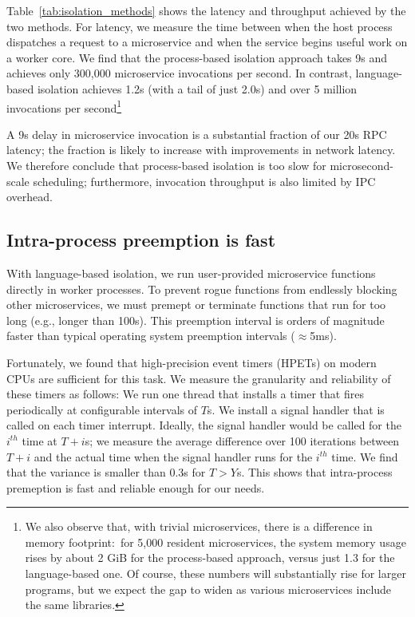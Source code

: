 Table~\ref{tab:isolation_methods} shows the latency and throughput achieved
by the two methods. For latency, we measure the time between when the host
process dispatches a request to a microservice and when the service begins
useful work on a worker core. We find that the process-based isolation approach
takes 9\textmu{}s and achieves only 300,000 microservice invocations per
second. In contrast, language-based isolation achieves 1.2\textmu{}s (with a tail
of just 2.0\textmu{}s) and over 5 million invocations per second\footnote{We also
observe that, with trivial microservices, there is a difference in memory
footprint:\ for 5,000 resident microservices, the system memory usage rises by about
2 GiB for the process-based approach, versus just 1.3 for the language-based one.  Of
course, these numbers will substantially rise for larger programs, but we expect the
gap to widen as various microservices include the same libraries.}

A 9\textmu{}s delay in microservice invocation is a substantial fraction of our
20\textmu{}s RPC latency;  the fraction is likely to increase with
improvements in network latency. We therefore conclude that process-based
isolation is too slow for microsecond-scale scheduling; furthermore, invocation
throughput is also limited by IPC overhead.

\subsection{Intra-process preemption is fast}
With language-based isolation, we run user-provided microservice functions
directly in worker processes. To prevent rogue functions from endlessly blocking
other microservices, we must premept or terminate functions that run for too
long (e.g., longer than 100\textmu{}s).  This
preemption interval is orders of magnitude faster than typical operating
system preemption intervals ($\approx$5ms).

Fortunately, we found that high-precision event timers (HPETs) on modern CPUs
are sufficient for this task. We measure the granularity and reliability of
these timers as follows: We run one thread that installs a timer that fires
periodically at configurable intervals of $T$\textmu{}s. We install a signal
handler that is called on each timer interrupt. Ideally, the signal handler
would be called for the $i^{th}$ time at $T + i$\textmu{}s; we measure the
average difference over 100 iterations between $T + i$ and the actual time
when the signal handler runs for the $i^{th}$ time. We find that the variance
is smaller than 0.3\textmu{}s for $T > Y$\textmu{}s. This shows that
intra-process premeption is fast and reliable enough for our needs.

